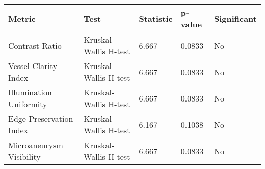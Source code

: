 \begin{tabular}{lllll}
\toprule
Metric & Test & Statistic & p-value & Significant \\
\midrule
Contrast Ratio & Kruskal-Wallis H-test & 6.667 & 0.0833 & No \\
Vessel Clarity Index & Kruskal-Wallis H-test & 6.667 & 0.0833 & No \\
Illumination Uniformity & Kruskal-Wallis H-test & 6.667 & 0.0833 & No \\
Edge Preservation Index & Kruskal-Wallis H-test & 6.167 & 0.1038 & No \\
Microaneurysm Visibility & Kruskal-Wallis H-test & 6.667 & 0.0833 & No \\
\bottomrule
\end{tabular}
